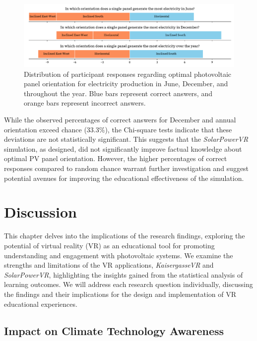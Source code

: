 \documentclass[draft, final]{vutinfth} %
\begin{document}
\begin{figure}[]
    \centering
    \includegraphics[width=\textwidth]{graphics/research-3.pdf}
    \caption{Distribution of participant responses regarding optimal photovoltaic panel orientation for electricity production in June, December, and throughout the year. Blue bars represent correct answers, and orange bars represent incorrect answers.}
    \label{fig:research-3}
\end{figure}

While the observed percentages of correct answers for December and annual orientation exceed chance (33.3\%), the Chi-square tests indicate that these deviations are not statistically significant. This suggests that the \textit{SolarPowerVR} simulation, as designed, did not significantly improve factual knowledge about optimal PV panel orientation. However, the higher percentages of correct responses compared to random chance warrant further investigation and suggest potential avenues for improving the educational effectiveness of the simulation.


\chapter{Discussion}

This chapter delves into the implications of the research findings, exploring the potential of virtual reality (VR) as an educational tool for promoting understanding and engagement with photovoltaic systems. We examine the strengths and limitations of the VR applications, \textit{KaisergasseVR} and \textit{SolarPowerVR}, highlighting the insights gained from the statistical analysis of learning outcomes. We will address each research question individually, discussing the findings and their implications for the design and implementation of VR educational experiences.

\section{Impact on Climate Technology Awareness}
\end{document}
